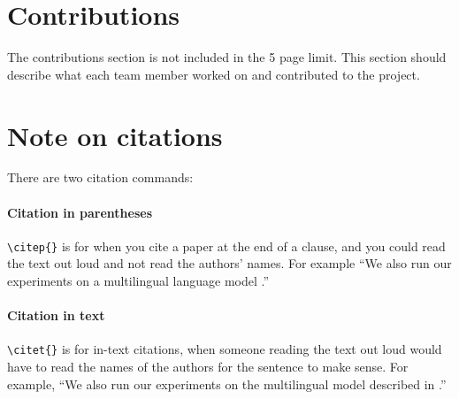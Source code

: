 \documentclass{article}
\begin{document}
\section{Contributions}
The contributions section is not included in the 5 page limit. This section should describe what each team member worked on and contributed to the project.

\section{Note on citations}

There are two citation commands:

\paragraph{Citation in parentheses} \verb|\citep{}| is for when you cite a paper at the end of a clause, and you could read the text out loud and not read the authors' names. For example ``We also run our experiments on a multilingual language model \citep{rajpurkar2018know}.'' 

\paragraph{Citation in text} \verb|\citet{}| is for in-text citations, when someone reading the text out loud would have to read the names of the authors for the sentence to make sense. For example, ``We also run our experiments on the multilingual model described in \citet{rajpurkar2018know}.''



\end{document}
